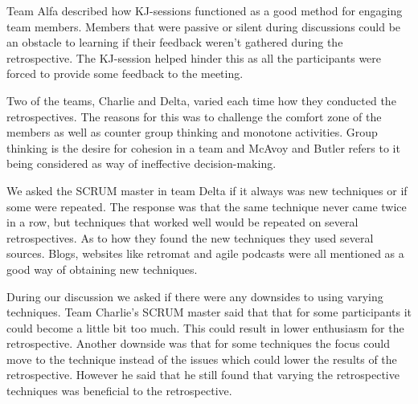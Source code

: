 Team Alfa described how KJ-sessions functioned as a good method for engaging team members. Members that were passive or silent during discussions could be an obstacle to learning if their feedback weren't gathered during the retrospective. The KJ-session helped hinder this as all the participants were forced to provide some feedback to the meeting.

Two of the teams, Charlie and Delta, varied each time how they conducted the retrospectives. The reasons for this was to challenge the comfort zone of the members as well as counter group thinking and monotone activities. Group thinking is the desire for cohesion in a team and McAvoy and Butler \cite{Mcavoy2007} refers to it being considered as way of ineffective decision-making. 

We asked the SCRUM master in team Delta if it always was new techniques or if some were repeated. The response was that the same technique never came twice in a row, but techniques that worked well would be repeated on several retrospectives. As to how they found the new techniques they used several sources. Blogs, websites like retromat \cite{retromat2015} and agile podcasts were all mentioned as a good way of obtaining new techniques. 

During our discussion we asked if there were any downsides to using varying techniques. Team Charlie's SCRUM master said that that for some participants it could become a little bit too much. This could result in lower enthusiasm for the retrospective. Another downside was that for some techniques the focus could move to the technique instead of the issues which could lower the results of the retrospective. However he said that he still found that varying the retrospective techniques was beneficial to the retrospective. 

\begin{table}[!h]
	\begin{center}
	\caption{Retrospective Techniques Used}
	\label{table:retrospective-techique}
	\end{center}
\end{table}


